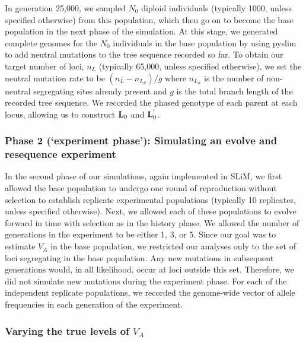 \documentclass[12pt]{article}
\begin{document}
\begin{bibunit}
In generation 25,000, we sampled $N_0$ diploid individuals (typically 1000, unless specified otherwise) from this population, which then go on to become the base population in the next phase of the simulation. At this stage, we generated complete genomes for the $N_0$ individuals in the base population by using pyslim to add neutral mutations to the tree sequence recorded so far. To obtain our target number of loci, $n_L$ (typically 65,000, unless specified otherwise), we set the neutral mutation rate to be $(n_L-n_{L_\mathcal{S}})/g$ where $n_{L_\mathcal{S}}$ is the number of non-neutral segregating sites already present and $g$ is the total branch length of the recorded tree sequence. We recorded the phased genotype of each parent at each locus, allowing  us to construct ${\bf L}_0$ and ${\bf L}^{'}_0$. 

\subsubsection*{Phase 2 (`experiment phase'): Simulating an evolve and resequence experiment}

In the second phase of our simulations, again implemented in SLiM, we first allowed the base population to undergo one round of reproduction without selection to establish replicate experimental populations (typically 10 replicates, unless specified otherwise). Next, we allowed each of these populations to evolve forward in time with selection as in the history phase. We allowed the number of generations in the experiment to be either 1, 3, or 5. Since our goal was to estimate $V_A$ in the base population, we restricted our analyses only to the set of loci segregating in the base population. Any new mutations in subsequent generations would, in all likelihood, occur at loci outside this set.  Therefore, we did not simulate new mutations during the experiment phase. For each of the independent replicate populations, we recorded the genome-wide vector of allele frequencies in each generation of the experiment. 

\subsubsection*{Varying the true levels of $V_A$}


\end{bibunit}
\end{document}
